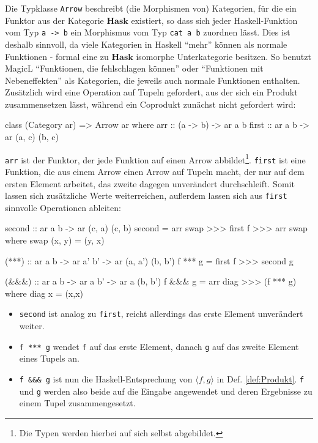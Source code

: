\documentclass[12pt, a4paper, bibgerm]{scrbook}
\newenvironment{DIFnomarkup}{}{}
\newcommand\icode[1]{\lstinline?#1?}
\newcommand{\dref}[1]{Def. \ref{def:#1}}
\begin{document}
Die Typklasse \icode{Arrow} beschreibt (die Morphismen von) Kategorien,
für die ein Funktor aus der Kategorie $\mathbf{Hask}$ existiert, so dass
sich jeder Haskell-Funktion vom Typ \icode{a -> b} ein Morphismus vom
Typ \icode{cat a b} zuordnen lässt. Dies ist deshalb sinnvoll, da viele
Kategorien in Haskell "`mehr"' können als normale Funktionen - formal
eine zu $\mathbf{Hask}$ isomorphe Unterkategorie besitzen. So benutzt
MagicL "`Funktionen, die fehlschlagen können"' oder "`Funktionen mit
Nebeneffekten"' als Kategorien, die jeweils auch normale Funktionen
enthalten. Zusätzlich wird eine Operation auf Tupeln gefordert, aus der
sich ein Produkt zusammensetzen lässt, während ein Coprodukt zunächst
nicht gefordert wird:
\begin{DIFnomarkup}\begin{code}
class (Category ar) => Arrow ar where
  arr   :: (a -> b) -> ar a b
  first :: ar a b   -> ar (a, c) (b, c)
\end{code}\end{DIFnomarkup}
\icode{arr} ist der Funktor, der jede Funktion auf einen Arrow
abbildet\footnote{Die Typen werden hierbei auf sich selbst abgebildet.}.
\icode{first} ist eine Funktion, die aus einem Arrow einen Arrow auf
Tupeln macht, der nur auf dem ersten Element arbeitet, das zweite
dagegen unverändert durchschleift. Somit lassen sich zusätzliche Werte
weiterreichen, außerdem lassen sich aus \icode{first} sinnvolle
Operationen ableiten:

\begin{DIFnomarkup}\begin{code}
  second :: ar a b -> ar (c, a) (c, b)
  second = arr swap >>> first f >>> arr swap
    where swap (x, y) = (y, x)

  (***) :: ar a b -> ar a' b' -> ar (a, a') (b, b')
  f *** g = first f >>> second g

  (&&&) :: ar a b -> ar a b' -> ar a (b, b')
  f &&& g = arr diag >>> (f *** g)
    where diag x = (x,x)
\end{code}\end{DIFnomarkup} %

\begin{itemize}
\item \icode{second} ist analog zu \icode{first}, reicht allerdings das erste
Element unverändert weiter.
\item \icode{f *** g} wendet \icode{f} auf das
erste Element, danach \icode{g} auf das zweite Element eines Tupels
an.
\item \icode{f &&& g} ist nun die Haskell-Entsprechung von $\langle f,g
\rangle$ in \dref{Produkt}. \icode{f} und \icode{g} werden also beide
auf die Eingabe angewendet und deren Ergebnisse zu einem Tupel
zusammengesetzt.
\end{itemize}
\end{document}
